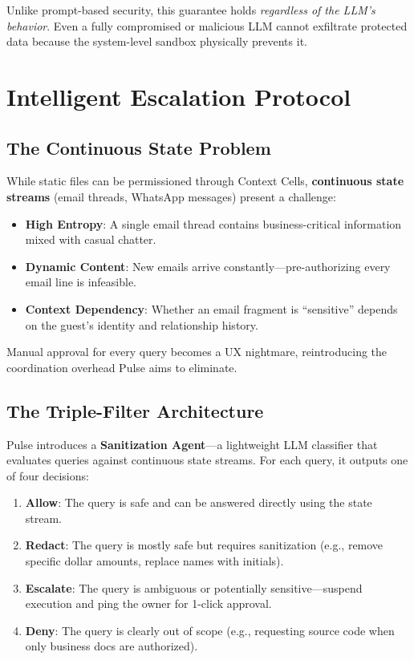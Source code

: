 Unlike prompt-based security, this guarantee holds \textit{regardless of the LLM's behavior}. Even a fully compromised or malicious LLM cannot exfiltrate protected data because the system-level sandbox physically prevents it.

\section{Intelligent Escalation Protocol}

\subsection{The Continuous State Problem}

While static files can be permissioned through Context Cells, \textbf{continuous state streams} (email threads, WhatsApp messages) present a challenge:

\begin{itemize}
    \item \textbf{High Entropy}: A single email thread contains business-critical information mixed with casual chatter.
    \item \textbf{Dynamic Content}: New emails arrive constantly—pre-authorizing every email line is infeasible.
    \item \textbf{Context Dependency}: Whether an email fragment is ``sensitive'' depends on the guest's identity and relationship history.
\end{itemize}

Manual approval for every query becomes a UX nightmare, reintroducing the coordination overhead Pulse aims to eliminate.

\subsection{The Triple-Filter Architecture}

Pulse introduces a \textbf{Sanitization Agent}—a lightweight LLM classifier that evaluates queries against continuous state streams. For each query, it outputs one of four decisions:

\begin{enumerate}
    \item \textbf{Allow}: The query is safe and can be answered directly using the state stream.

    \item \textbf{Redact}: The query is mostly safe but requires sanitization (e.g., remove specific dollar amounts, replace names with initials).

    \item \textbf{Escalate}: The query is ambiguous or potentially sensitive—suspend execution and ping the owner for 1-click approval.

    \item \textbf{Deny}: The query is clearly out of scope (e.g., requesting source code when only business docs are authorized).
\end{enumerate}


